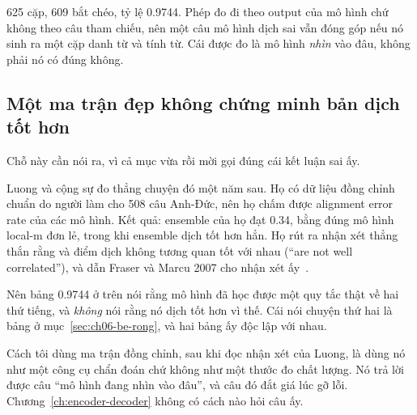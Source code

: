625 cặp, 609 bắt chéo, tỷ lệ 0.9744. Phép đo đi theo output của mô hình chứ
không theo câu tham chiếu, nên một câu mô hình dịch sai vẫn đóng góp nếu nó
sinh ra một cặp danh từ và tính từ. Cái được đo là mô hình \emph{nhìn} vào đâu,
không phải nó có đúng không.

\subsection*{Một ma trận đẹp không chứng minh bản dịch tốt hơn}

%
Chỗ này cần nói ra, vì cả mục vừa rồi mời gọi đúng cái kết luận sai ấy.

Luong và cộng sự đo thẳng chuyện đó một năm sau. Họ có dữ liệu đồng chỉnh chuẩn
do người làm cho 508 câu Anh-Đức, nên họ chấm được alignment error rate của các
mô hình. Kết quả: ensemble của họ đạt 0.34, bằng đúng mô hình local-m đơn lẻ,
trong khi ensemble dịch tốt hơn hẳn. Họ rút ra nhận xét thẳng thắn rằng
 và điểm dịch không tương quan tốt với
nhau (\enquote{are not well correlated}), và dẫn Fraser và
Marcu 2007 cho nhận xét ấy~\autocite{luong2015effective}.

Nên bảng 0.9744 ở trên nói rằng mô hình đã học được một quy tắc thật về hai thứ
tiếng, và \emph{không} nói rằng nó dịch tốt hơn vì thế. Cái nói chuyện thứ hai
là bảng ở mục~\ref{sec:ch06-be-rong}, và hai bảng ấy độc lập với nhau.

Cách tôi dùng ma trận đồng chỉnh, sau khi đọc nhận xét của Luong, là dùng nó
như một công cụ chẩn đoán chứ không như một thước đo chất lượng. Nó trả lời
được câu \enquote{mô hình đang nhìn vào đâu}, và câu đó đắt giá lúc gỡ lỗi.
Chương~\ref{ch:encoder-decoder} không có cách nào hỏi câu ấy.
